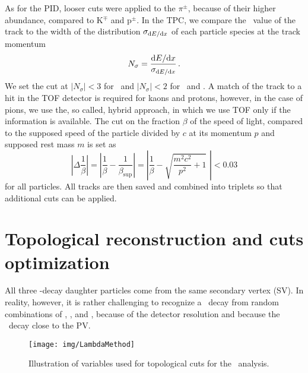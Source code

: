 As for the PID, looser cuts were applied to the $\pi^\pm$, because of their higher abundance, compared to K$^\mp$ and p$^\pm$. In the TPC, we compare the \dedx\ value of the track to the width of the distribution $\sigma_{\mathrm{d} E / \mathrm{d} x}$ of each particle species at the track momentum
\begin{equation}
N_\sigma = \frac{\mathrm{d} E / \mathrm{d} x}{\sigma_{\mathrm{d} E / \mathrm{d} x}}\,. 
\end{equation}
We set the cut at $|N_\sigma| < 3$ for \pipm\ and $|N_\sigma| < 2$ for \Kmp\ and \ppm\@. A match of the track to a hit in the TOF detector is required for kaons and protons, however, in the case of pions, we use the, so called, hybrid approach, in which we use TOF only if the information is available. The cut on the fraction $\beta$ of the speed of light, compared to the supposed speed of the particle divided by $c$ at its momentum $p$ and supposed rest mass $m$ is set as
\begin{equation}
 \left|\Delta \frac{1}{\beta}\right| = \left| \frac{1}{\beta} - \frac{1}{\beta_\mathrm{sup}} \right| = \left| \frac{1}{\beta} - \sqrt{\frac{m^2c^2}{p^2} + 1} \,\,\right| < 0.03
\end{equation}
for all particles. All tracks are then saved and combined into triplets so that additional cuts can be applied.


\section{Topological reconstruction and cuts optimization}

All three \Lambdac-decay daughter particles come from the same secondary vertex (SV)\@. In reality, however, it is rather challenging to recognize a \Lambdac\ decay from random combinations of \pipm, \Kmp, and \ppm, because of the detector resolution and because the \Lambdac\ decay close to the PV\@.

\begin{figure}[!htb]
\centering
\texttt{[image: img/LambdaMethod]}
\caption{Illustration of variables used for topological cuts for the \Lambdac\ analysis.}
\label{fig:method}
\end{figure}

